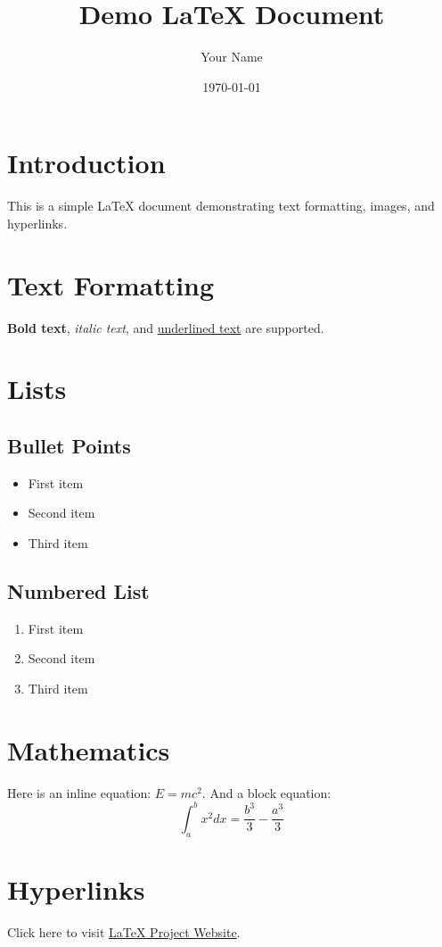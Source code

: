 \documentclass[10pt, letterpaper]{article}
\title{\textbf{Demo LaTeX Document}}
\author{Your Name}
\date{\today}
\begin{document}
\maketitle

\section{Introduction}
This is a simple LaTeX document demonstrating text formatting, images, and hyperlinks.

\section{Text Formatting}
\textbf{Bold text}, \textit{italic text}, and \underline{underlined text} are supported.

\section{Lists}
\subsection{Bullet Points}
\begin{itemize}
    \item First item
    \item Second item
    \item Third item
\end{itemize}

\subsection{Numbered List}
\begin{enumerate}
    \item First item
    \item Second item
    \item Third item
\end{enumerate}

\section{Mathematics}
Here is an inline equation: \( E = mc^2 \).  
And a block equation:
\[
\int_a^b x^2 dx = \frac{b^3}{3} - \frac{a^3}{3}
\]

\section{Hyperlinks}
Click here to visit \href{https://www.latex-project.org/}{LaTeX Project Website}.
\end{document}
